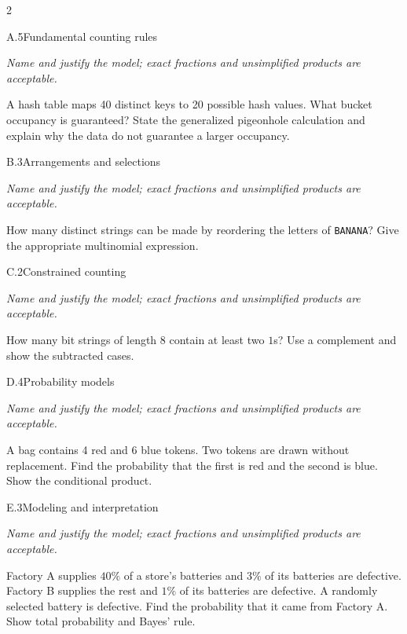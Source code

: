 \documentclass[9pt]{extarticle}
\begin{document}
\begin{multicols}{2}
\begin{CoreProblem}{A.5}{Fundamental counting rules}
{\scriptsize\textit{Name and justify the model; exact fractions and unsimplified products are acceptable.}\par}
A hash table maps 40 distinct keys to 20 possible hash values. What
    bucket occupancy is guaranteed? State the generalized pigeonhole calculation
    and explain why the data do not guarantee a larger occupancy.
\end{CoreProblem}
\begin{CoreProblem}{B.3}{Arrangements and selections}
{\scriptsize\textit{Name and justify the model; exact fractions and unsimplified products are acceptable.}\par}
How many distinct strings can be made by reordering the letters of
    \texttt{BANANA}? Give the appropriate multinomial expression.
\end{CoreProblem}
\begin{CoreProblem}{C.2}{Constrained counting}
{\scriptsize\textit{Name and justify the model; exact fractions and unsimplified products are acceptable.}\par}
How many bit strings of length 8 contain at least two $1$s? Use a
    complement and show the subtracted cases.
\end{CoreProblem}
\columnbreak
\begin{CoreProblem}{D.4}{Probability models}
{\scriptsize\textit{Name and justify the model; exact fractions and unsimplified products are acceptable.}\par}
A bag contains 4 red and 6 blue tokens. Two tokens are drawn without
    replacement. Find the probability that the first is red and the second is
    blue. Show the conditional product.
\end{CoreProblem}
\begin{CoreProblem}{E.3}{Modeling and interpretation}
{\scriptsize\textit{Name and justify the model; exact fractions and unsimplified products are acceptable.}\par}
Factory A supplies $40\%$ of a store's batteries and $3\%$ of its
    batteries are defective. Factory B supplies the rest and $1\%$ of its
    batteries are defective. A randomly selected battery is defective. Find the
    probability that it came from Factory A. Show total probability and Bayes'
    rule.
\end{CoreProblem}
\end{multicols}
\CoreWorkArea
\end{document}
